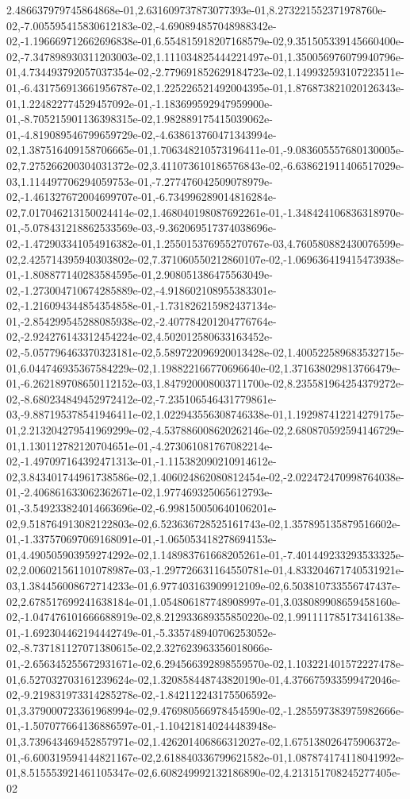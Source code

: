 2.486637979745864868e-01,2.631609737873077393e-01,8.273221552371978760e-02,-7.005595415830612183e-02,-4.690894857048988342e-02,-1.196669712662696838e-01,6.554815918207168579e-02,9.351505339145660400e-02,-7.347898930311203003e-02,1.111034825444221497e-01,1.350056976079940796e-01,4.734493792057037354e-02,-2.779691852629184723e-02,1.149932593107223511e-01,-6.431756913661956787e-02,1.225226521492004395e-01,1.876873821020126343e-01,1.224822774529457092e-01,-1.183699592947959900e-01,-8.705215901136398315e-02,1.982889175415039062e-01,-4.819089546799659729e-02,-4.638613760471343994e-02,1.387516409158706665e-01,1.706348210573196411e-01,-9.083605557680130005e-02,7.275266200304031372e-02,3.411073610186576843e-02,-6.638621911406517029e-03,1.114497706294059753e-01,-7.277476042509078979e-02,-1.461327672004699707e-01,-6.734996289014816284e-02,7.017046213150024414e-02,1.468040198087692261e-01,-1.348424106836318970e-01,-5.078431218862533569e-03,-9.362069517374038696e-02,-1.472903341054916382e-01,1.255015376955270767e-03,4.760580882430076599e-02,2.425714395940303802e-02,7.371060550212860107e-02,-1.069636419415473938e-01,-1.808877140283584595e-01,2.908051386475563049e-02,-1.273004710674285889e-02,-4.918602108955383301e-02,-1.216094344854354858e-01,-1.731826215982437134e-01,-2.854299545288085938e-02,-2.407784201204776764e-02,-2.924276143312454224e-02,4.502012580633163452e-02,-5.057796463370323181e-02,5.589722096920013428e-02,1.400522589683532715e-01,6.044746935367584229e-02,1.198822166770696640e-02,1.371638029813766479e-01,-6.262189708650112152e-03,1.847920008003711700e-02,8.235581964254379272e-02,-8.680234849452972412e-02,-7.235106546431779861e-03,-9.887195378541946411e-02,1.022943556308746338e-01,1.192987412214279175e-01,2.213204279541969299e-02,-4.537886008620262146e-02,2.680870592594146729e-01,1.130112782120704651e-01,-4.273061081767082214e-02,-1.497097164392471313e-01,-1.115382090210914612e-02,3.843401744961738586e-02,1.406024862080812454e-02,-2.022472470998764038e-01,-2.406861633062362671e-02,1.977469325065612793e-01,-3.549233824014663696e-02,-6.998150050640106201e-02,9.518764913082122803e-02,6.523636728525161743e-02,1.357895135879516602e-01,-1.337570697069168091e-01,-1.065053418278694153e-01,4.490505903959274292e-02,1.148983761668205261e-01,-7.401449233293533325e-02,2.006021561101078987e-03,-1.297726631164550781e-01,4.833204671740531921e-03,1.384456008672714233e-01,6.977403163909912109e-02,6.503810733556747437e-02,2.678517699241638184e-01,1.054806187748908997e-01,3.038089908659458160e-02,-1.047476101666688919e-02,8.212933689355850220e-02,1.991111785173416138e-01,-1.692304462194442749e-01,-5.335748940706253052e-02,-8.737181127071380615e-02,2.327623963356018066e-01,-2.656345255672931671e-02,6.294566392898559570e-02,1.103221401572227478e-01,6.527032703161239624e-02,1.320858448743820190e-01,4.376675933599472046e-02,-9.219831973314285278e-02,-1.842112243175506592e-01,3.379000723361968994e-02,9.476980566978454590e-02,-1.285597383975982666e-01,-1.507077664136886597e-01,-1.104218140244483948e-01,3.739643469452857971e-02,1.426201406866312027e-02,1.675138026475906372e-01,-6.600319594144821167e-02,2.618840336799621582e-01,1.087874174118041992e-01,8.515553921461105347e-02,6.608249992132186890e-02,4.213151708245277405e-02
